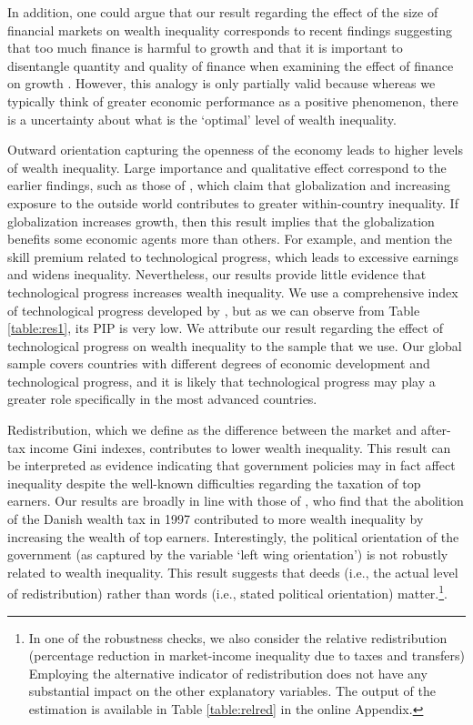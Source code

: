 \documentclass[a4paper,11pt]{article}
\begin{document}
In addition, one could argue that our result regarding the effect of the size of financial markets on wealth inequality corresponds to recent findings suggesting that too much finance is harmful to growth \citep{Arcandetal2012,CecchettiKharroubi2012,LawSingh2014} and that it is important to disentangle quantity and quality of finance when examining the effect of finance on growth \citep{hasan2016}. However, this analogy is only partially valid because whereas we typically think of greater economic performance as a positive phenomenon, there is a uncertainty about what is the `optimal' level of wealth inequality. 

Outward orientation capturing the openness of the economy leads to higher levels of wealth inequality. Large importance and qualitative effect correspond to the earlier findings, such as those of \citet{dabla2015causes}, which claim that globalization and increasing exposure to the outside world contributes to greater within-country inequality. If globalization increases growth, then this result implies that the globalization benefits some economic agents more than others. For example, \citet{dabla2015causes} and \citet{milanovic2016global} mention the skill premium related to technological progress, which leads to excessive earnings and widens inequality. Nevertheless, our results provide little evidence that technological progress increases wealth inequality. We use a comprehensive index of technological progress developed by \citet{comin}, but as we can observe from Table \ref{table:res1}, its PIP is very low. We attribute our result regarding the effect of technological progress on wealth inequality to the sample that we use. Our global sample covers countries with different degrees of economic development and technological progress, and it is likely that technological progress may play a greater role specifically in the most advanced countries. 

Redistribution, which we define as the difference between the market and after-tax income Gini indexes, contributes to lower wealth inequality. This result can be interpreted as evidence indicating that government policies may in fact affect inequality despite the well-known difficulties regarding the taxation of top earners. Our results are broadly in line with those of \citet{jakobsen2018}, who find that the abolition of the Danish wealth tax in 1997 contributed to more wealth inequality by increasing the wealth of top earners. Interestingly, the political orientation of the government (as captured by the variable `left wing orientation') is not robustly related to wealth inequality. This result suggests that deeds (i.e., the actual level of redistribution) rather than words (i.e., stated political orientation) matter.\footnote{In one of the robustness checks, we also consider the relative redistribution (percentage reduction in market-income inequality due to taxes and transfers) Employing the alternative indicator of redistribution does not have any substantial impact on the other explanatory variables. The output of the estimation is available in Table \ref{table:relred} in the online Appendix.}.
\end{document}
